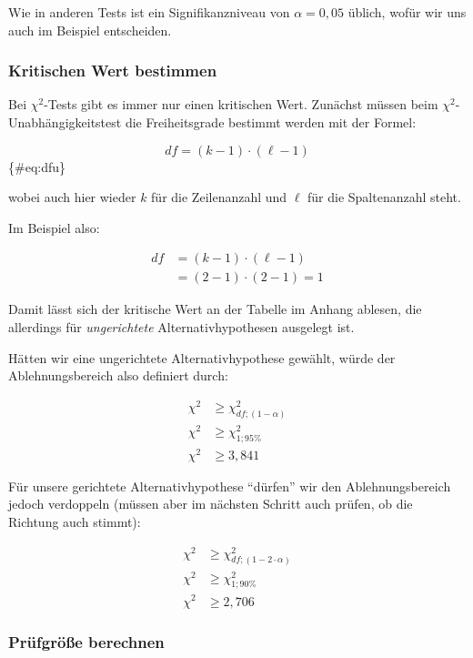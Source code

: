 \documentclass[
  ngerman,
]{article}
\begin{document}
Wie in anderen Tests ist ein Signifikanzniveau von \(\alpha=0,05\) üblich, wofür wir uns auch im Beispiel entscheiden.

\hypertarget{kritischen-wert-bestimmen}{%
\subsubsection{Kritischen Wert bestimmen}\label{kritischen-wert-bestimmen}}

Bei \(\chi^2\)-Tests gibt es immer nur einen kritischen Wert. Zunächst müssen beim \(\chi^2\)-Unabhängigkeitstest die Freiheitsgrade bestimmt werden mit der Formel:

\[\mathit{df} = (k - 1) \cdot (\ell - 1) \]\{\#eq:dfu\}

wobei auch hier wieder \(k\) für die Zeilenanzahl und \(\ell\) für die Spaltenanzahl steht.

Im Beispiel also:

\[\begin{aligned}
\mathit{df} &= (k - 1) \cdot (\ell - 1)\\
&=(2-1)\cdot (2 - 1) = 1
\end{aligned}\]

Damit lässt sich der kritische Wert an der Tabelle im Anhang ablesen, die allerdings für \emph{ungerichtete} Alternativhypothesen ausgelegt ist.

Hätten wir eine ungerichtete Alternativhypothese gewählt, würde der Ablehnungsbereich also definiert durch:

\[\begin{aligned}
\chi^2 &\geq \chi^2_{df;(1-\alpha)}\\
\chi^2 &\geq \chi^2_{1;95\%}\\
\chi^2 &\geq 3,841
\end{aligned}\]

Für unsere gerichtete Alternativhypothese ``dürfen'' wir den Ablehnungsbereich jedoch verdoppeln (müssen aber im nächsten Schritt auch prüfen, ob die Richtung auch stimmt):

\[\begin{aligned}
\chi^2 &\geq \chi^2_{df;(1-2\cdot\alpha)}\\
\chi^2 &\geq \chi^2_{1;90\%}\\
\chi^2 &\geq 2,706
\end{aligned}\]

\hypertarget{pruxfcfgruxf6uxdfe-berechnen-4}{%
\subsubsection{Prüfgröße berechnen}\label{pruxfcfgruxf6uxdfe-berechnen-4}}
\end{document}
